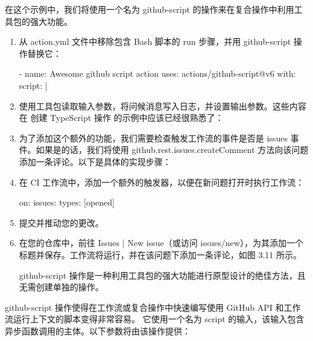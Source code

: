 在这个示例中，我们将使用一个名为 github-script 的操作来在复合操作中利用工具包的强大功能。


\begin{enumerate}
\item 
从 action.yml 文件中移除包含 Bash 脚本的 run 步骤，并用 github-script 操作替换它：

\begin{shell}
- name: Awesome github script action
  uses: actions/github-script@v6
  with:
    script: |
\end{shell}

\item 
使用工具包读取输入参数，将问候消息写入日志，并设置输出参数。这些内容在 创建 TypeScript 操作 的示例中应该已经很熟悉了：


\item 
为了添加这个额外的功能，我们需要检查触发工作流的事件是否是 issues 事件。如果是的话，我们将使用 github.rest.issues.createComment 方法向该问题添加一条评论。以下是具体的实现步骤：


\item 
在 CI 工作流中，添加一个额外的触发器，以便在新问题打开时执行工作流：

\begin{shell}
on:
  issues:
    types: [opened]
\end{shell}

\item 
提交并推动您的更改。

\item 
在您的仓库中，前往 Issues | New issue（或访问 issues/new），为其添加一个标题并保存。工作流将运行，并在该问题下添加一条评论，如图 3.11 所示。


github-script 操作是一种利用工具包的强大功能进行原型设计的绝佳方法，且无需创建单独的操作。
\end{enumerate}


github-script 操作使得在工作流或复合操作中快速编写使用 GitHub API 和工作流运行上下文的脚本变得非常容易。 它使用一个名为 script 的输入，该输入包含异步函数调用的主体。以下参数将由该操作提供：


